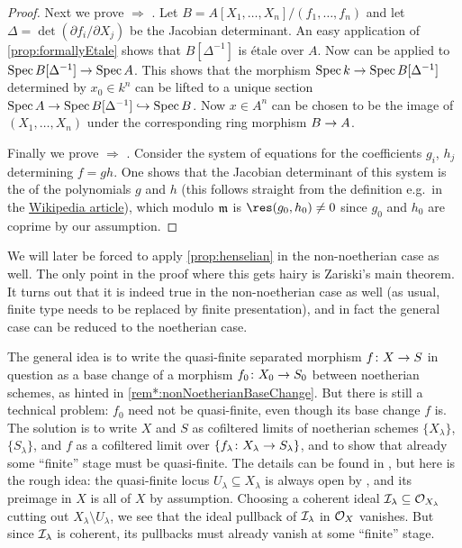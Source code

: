 \documentclass[a4paper, 10pt, oneside, DIV=9, chapterprefix=true, numbers=enddot, bibliography=totoc]{scrbook}
\begin{document}
\begin{proof}
	Next we prove  $\Rightarrow$ . Let $B=A[X_1,\dotsc,X_n]/(f_1,\dotsc,f_n)$ and let $\Delta=\det(\partial f_i/\partial X_j)$ be the Jacobian determinant. An easy application of \cref{prop:formallyEtale} shows that $B[\Delta^{-1}]$ is étale over $A$. Now  can be applied to $\Spec B[\Delta^{-1}]\morphism \Spec A$. This shows that the morphism $\Spec k\morphism \Spec B[\Delta^{-1}]$ determined by $x_0\in k^n$ can be lifted to a unique section $\Spec A\morphism \Spec B[\Delta^{-1}]\monomorphism \Spec B$. Now $x\in A^n$ can be chosen to be the image of $(X_1,\dotsc,X_n)$ under the corresponding ring morphism $B\morphism A$. 
	
	Finally we prove  $\Rightarrow$ . Consider the system of equations for the coefficients $g_i$, $h_j$ determining $f=gh$. One shows that the Jacobian determinant of this system is the  of the polynomials $g$ and $h$ (this follows straight from the definition e.g.\ in the \href{https://en.wikipedia.org/wiki/Resultant}{Wikipedia article}), which modulo $\mathfrak{m}$ is $\res(g_0,h_0)\neq 0$ since $g_0$ and $h_0$ are coprime by our assumption.
\end{proof}
\begin{rem}\label{rem:nonNoetherian}
	We will later be forced to apply \cref{prop:henselian} in the non-noetherian case as well. The only point in the proof where this gets hairy is Zariski's main theorem. It turns out that it is indeed true in the non-noetherian case as well (as usual, finite type needs to be replaced by finite presentation), and in fact the general case can be reduced to the noetherian case.
	
	The general idea is to write the quasi-finite separated morphism $f\colon X\morphism S$ in question as a base change of a morphism $f_0\colon X_0\morphism S_0$ between noetherian schemes, as hinted in \cref{rem*:nonNoetherianBaseChange}. But there is still a technical problem: $f_0$ need not be quasi-finite, even though its base change $f$ is. The solution is to write $X$ and $S$ as cofiltered limits of noetherian schemes $\{X_\lambda\}$, $\{S_\lambda\}$, and $f$ as a cofiltered limit over $\{f_\lambda\colon X_\lambda\morphism S_\lambda\}$, and to show that already some \enquote{finite} stage must be quasi-finite. The details can be found in \cite[Théorème~(8.10.5)]{egaIV3}, but here is the rough idea: the quasi-finite locus $U_\lambda\subseteq X_\lambda$ is always open by \cite[Theorem~2]{jacobians}, and its preimage in $X$ is all of $X$ by assumption. Choosing a coherent ideal $\mathcal{I}_\lambda\subseteq \mathcal{O}_{X_\lambda}$ cutting out $X_\lambda\setminus U_\lambda$, we see that the ideal pullback of $\mathcal{I}_\lambda$ in $\mathcal{O}_X$ vanishes. But since $\mathcal{I}_\lambda$ is coherent, its pullbacks must already vanish at some \enquote{finite} stage.
\end{rem}
\end{document}
